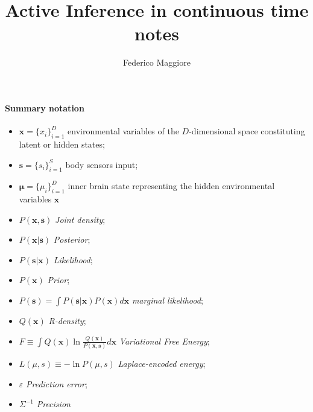 \documentclass[a4paper, 10pt]{article}
\title{Active Inference in continuous time notes}
\author{Federico Maggiore}
\begin{document}

\maketitle

\newpage

\tableofcontents

\newpage

\paragraph{\textbf{Summary notation}}
\begin{itemize}

\item $\mathbf x = \lbrace{ x_i \rbrace}_{i=1}^{D}$ environmental variables of the $D$-dimensional space constituting latent or hidden states;

\item $\mathbf{s} = \lbrace{ s_i \rbrace}_{i=1}^{S}$ body sensors input;

\item $\bm \mu = \lbrace \mu_i \rbrace_{i=1}^D$ inner brain state representing the hidden environmental variables $\mathbf x$

\item $P(\mathbf{x},\mathbf{s})$ \emph{Joint density};

\item $P(\mathbf{x}|\mathbf{s})$ \emph{Posterior}; 

\item $P(\mathbf{s}|\mathbf{x})$ \emph{Likelihood};

\item $P(\mathbf x)$ \emph{Prior};

\item $P(\mathbf s)=\int P(\mathbf s|\mathbf x)P(\mathbf x) d\mathbf x $ \emph{marginal likelihood};

\item $Q(\mathbf x)$ \emph{R-density};

\item $F \equiv \int Q(\mathbf x) \ln \frac{Q(\mathbf x)}{P(\mathbf x,\mathbf s)}d\mathbf x $ \emph{Variational Free Energy};

\item $L(\mu,s) \equiv - \ln P(\mu,s)$ \emph{Laplace-encoded energy};

\item $\varepsilon$ \emph{Prediction error};

\item $\Sigma^{-1}$ \emph{Precision}
\end{itemize}
\end{document}
